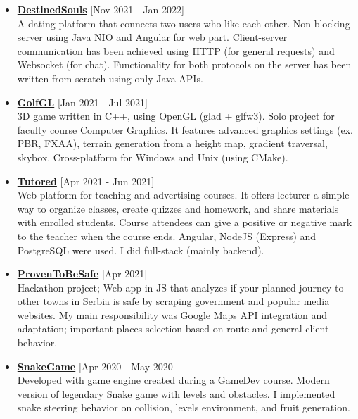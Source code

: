 \documentclass[a4paper]{moderncv}
\begin{document}
		\begin{itemize}

			\item \textbf{\href{https://github.com/MATF-Computer-Networks-Projects/2021_DestinedSouls}{DestinedSouls}} \hfill[Nov 2021 - Jan 2022]\\
			A dating platform that connects two users who like each other. Non-blocking server using Java NIO and Angular for 
			web part. Client-server communication has been achieved using HTTP (for general requests) and Websocket (for chat).
			Functionality for both protocols on the server has been written from scratch using only Java APIs.
						
			\item \textbf{\href{https://github.com/djordjetane/GolfGL}{GolfGL}} \hfill[Jan 2021 - Jul 2021]\\
			3D game written in C++, using OpenGL (glad + glfw3). Solo project for faculty course Computer Graphics. 
			It features advanced graphics settings (ex. PBR, FXAA), terrain generation from a height map, gradient traversal, skybox.
			Cross-platform for Windows and Unix (using CMake).

			\item \textbf{\href{https://gitlab.com/matfpveb/projekti/2020-2021/18-Tutored}{Tutored}} \hfill[Apr 2021 - Jun 2021]\\
			Web platform for teaching and advertising courses. It offers lecturer a simple way to organize classes, create quizzes and homework, and share materials with enrolled students.
			Course attendees can give a positive or negative mark to the teacher when the course ends. Angular, NodeJS (Express) and PostgreSQL were used. 
			I did full-stack (mainly backend).

			\item \textbf{\href{https://github.com/idakucamupeva/dokazano_bezbedno}{ProvenToBeSafe}} \hfill[Apr 2021]\\
			Hackathon project; Web app in JS that analyzes if your planned journey to other towns in Serbia is safe by scraping
			government and popular media websites. My main responsibility was Google Maps API integration and adaptation; 
			important places selection based on route and general client behavior.
		
			\item \textbf{\href{https://github.com/djordjetane/SnakeGame}{SnakeGame}} \hfill[Apr 2020 - May 2020]\\
			Developed with game engine created during a GameDev course. Modern version of legendary Snake game with levels 
			and obstacles. I implemented snake steering behavior on collision, levels environment, and fruit generation.


\end{itemize}
\end{document}

